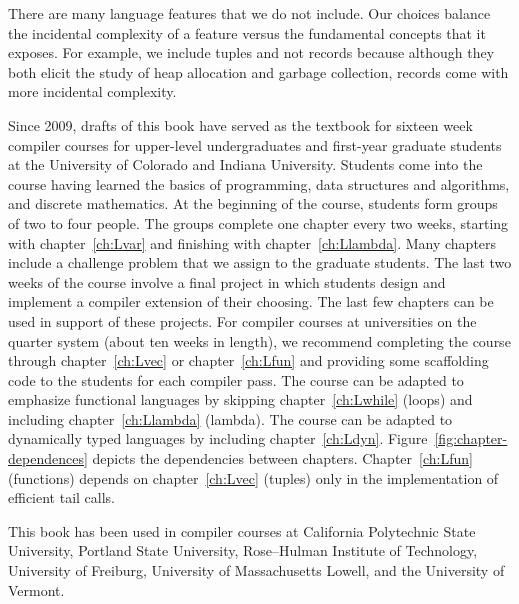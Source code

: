 \documentclass[7x10]{TimesAPriori_MIT}%
\def\pythonEd{1}
\def\edition{0}
\newcommand{\python}[1]{{\if\edition\pythonEd #1\fi}}
\numberwithin{theorem}{chapter}
\numberwithin{definition}{chapter}
\numberwithin{equation}{chapter}
\begin{document}
There are many language features that we do not include. Our choices
balance the incidental complexity of a feature versus the fundamental
concepts that it exposes. For example, we include tuples and not
records because although they both elicit the study of heap allocation and
garbage collection, records come with more incidental complexity.

Since 2009, drafts of this book have served as the textbook for
sixteen week compiler courses for upper-level undergraduates and
first-year graduate students at the University of Colorado and Indiana
University.
%
Students come into the course having learned the basics of
programming, data structures and algorithms, and discrete
mathematics.
%
At the beginning of the course, students form groups of two to four
people.  The groups complete one chapter every two weeks, starting
with chapter~\ref{ch:Lvar} and finishing with
chapter~\ref{ch:Llambda}. Many chapters include a challenge problem
that we assign to the graduate students. The last two weeks of the
course involve a final project in which students design and implement
a compiler extension of their choosing.  The last few chapters can be
used in support of these projects.  For compiler courses at
universities on the quarter system (about ten weeks in length), we
recommend completing the course through chapter~\ref{ch:Lvec} or
chapter~\ref{ch:Lfun} and providing some scaffolding code to the
students for each compiler pass.
%
The course can be adapted to emphasize functional languages by
skipping chapter~\ref{ch:Lwhile} (loops) and including
chapter~\ref{ch:Llambda} (lambda). The course can be adapted to
dynamically typed languages by including chapter~\ref{ch:Ldyn}.
%
%
Figure~\ref{fig:chapter-dependences} depicts the dependencies between
chapters. Chapter~\ref{ch:Lfun} (functions) depends on
chapter~\ref{ch:Lvec} (tuples) only in the implementation of efficient
tail calls.

This book has been used in compiler courses at California Polytechnic
State University, Portland State University, Rose–Hulman Institute of
Technology, University of Freiburg, University of Massachusetts
Lowell, and the University of Vermont.
\end{document}
